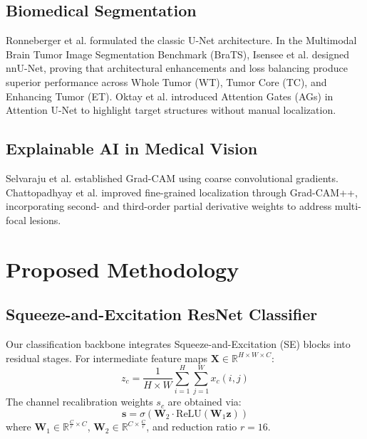\documentclass[conference]{IEEEtran}
\begin{document}
\subsection{Biomedical Segmentation}
Ronneberger et al. \cite{ronneberger2015u} formulated the classic U-Net architecture. In the Multimodal Brain Tumor Image Segmentation Benchmark (BraTS), Isensee et al. \cite{isensee2021nnu} designed nnU-Net, proving that architectural enhancements and loss balancing produce superior performance across Whole Tumor (WT), Tumor Core (TC), and Enhancing Tumor (ET). Oktay et al. \cite{oktay2018attention} introduced Attention Gates (AGs) in Attention U-Net to highlight target structures without manual localization.

\subsection{Explainable AI in Medical Vision}
Selvaraju et al. \cite{selvaraju2017grad} established Grad-CAM using coarse convolutional gradients. Chattopadhyay et al. \cite{chattopadhay2018grad} improved fine-grained localization through Grad-CAM++, incorporating second- and third-order partial derivative weights to address multi-focal lesions.

\section{Proposed Methodology}

\subsection{Squeeze-and-Excitation ResNet Classifier}
Our classification backbone integrates Squeeze-and-Excitation (SE) blocks \cite{hu2018squeeze} into residual stages. For intermediate feature maps $\mathbf{X} \in \mathbb{R}^{H \times W \times C}$:
\begin{equation}
z_c = \frac{1}{H \times W} \sum_{i=1}^H \sum_{j=1}^W x_c(i, j)
\end{equation}
The channel recalibration weights $s_c$ are obtained via:
\begin{equation}
\mathbf{s} = \sigma\left(\mathbf{W}_2 \cdot \text{ReLU}(\mathbf{W}_1 \mathbf{z})\right)
\end{equation}
where $\mathbf{W}_1 \in \mathbb{R}^{\frac{C}{r} \times C}$, $\mathbf{W}_2 \in \mathbb{R}^{C \times \frac{C}{r}}$, and reduction ratio $r=16$.
\end{document}
